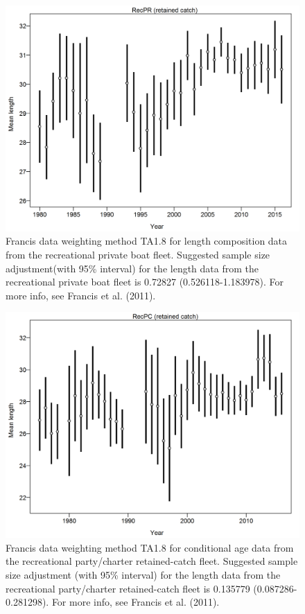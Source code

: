 \documentclass[12pt,]{article}
\begin{document}
\begin{figure}[htbp]
\centering
\includegraphics{r4ss/plots_mod1/comp_lendat_data_weighting_TA1.8_RecPR.png}
\caption{Francis data weighting method TA1.8 for length composition data
from the recreational private boat fleet. Suggested sample size
adjustment(with 95\% interval) for the length data from the recreational
private boat fleet is 0.72827 (0.526118-1.183978). For more info, see
Francis et al. (2011).
\label{fig:comp_lendat_data_weighting_TA1.8_RecPR}}
\end{figure}

\begin{figure}[htbp]
\centering
\includegraphics{r4ss/plots_mod1/comp_lendat_data_weighting_TA1.8_RecPC.png}
\caption{Francis data weighting method TA1.8 for conditional age data
from the recreational party/charter retained-catch fleet. Suggested
sample size adjustment (with 95\% interval) for the length data from the
recreational party/charter retained-catch fleet is 0.135779
(0.087286-0.281298). For more info, see Francis et al. (2011).
\label{fig:comp_lendat_data_weighting_TA1.8_RecPC}}
\end{figure}
\end{document}
